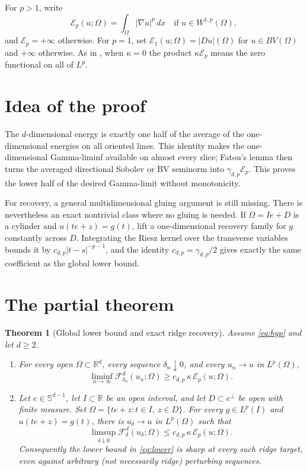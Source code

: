 \documentclass[11pt]{article}
\newtheorem{theorem}{Theorem}
\newcommand{\R}{\mathbb R}
\newcommand{\Sph}{\mathbb S}
\newcommand{\F}{\mathcal F}
\newcommand{\E}{\mathcal E}
\begin{document}
For $p>1$, write
\[
 \E_p(u;\Omega)=\int_\Omega|\nabla u|^p\,dx
 \quad\text{if }u\in W^{1,p}(\Omega),
\]
and $\E_p=+\infty$ otherwise.  For $p=1$, set
$\E_1(u;\Omega)=|Du|(\Omega)$ for $u\in BV(\Omega)$ and $+\infty$
otherwise.  As in \cite{BN1D}, when $\kappa=0$ the product
$\kappa\E_p$ means the zero functional on all of $L^p$.

\section{Idea of the proof}

The $d$-dimensional energy is exactly one half of the average of the
one-dimensional energies on all oriented lines.  This identity makes the
one-dimensional Gamma-liminf available on almost every slice; Fatou's lemma
then turns the averaged directional Sobolev or BV seminorm into
$\gamma_{d,p}\E_p$.  This proves the lower half of the desired Gamma-limit
without monotonicity.

For recovery, a general multidimensional gluing argument is still missing.
There is nevertheless an exact nontrivial class where no gluing is needed.
If $\Omega=I e+D$ is a cylinder and $u(te+z)=g(t)$, lift a one-dimensional
recovery family for $g$ constantly across $D$.  Integrating the Riesz kernel
over the transverse variables bounds it by
$c_{d,p}|t-s|^{-p-1}$, and the identity $c_{d,p}=\gamma_{d,p}/2$ gives exactly
the same coefficient as the global lower bound.

\section{The partial theorem}

\begin{theorem}[Global lower bound and exact ridge recovery]\label{thm:main}
Assume \eqref{eq:hyp} and let $d\geq2$.

\begin{enumerate}[label=\textup{(\roman*)}]
\item\label{it:lower}
For every open $\Omega\subset\R^d$, every sequence $\delta_n\downarrow0$,
and every $u_n\to u$ in $L^p(\Omega)$,
\begin{equation}\label{eq:lower}
 \liminf_{n\to\infty}\F^d_{\delta_n}(u_n;\Omega)
 \geq c_{d,p}\,\kappa\,\E_p(u;\Omega).
\end{equation}

\item\label{it:ridge}
Let $e\in\Sph^{d-1}$, let $I\subset\R$ be an open interval, and let
$D\subset e^\perp$ be open with finite measure.  Set
$\Omega=\{te+z:t\in I,\ z\in D\}$.  For every $g\in L^p(I)$ and
$u(te+z)=g(t)$, there is $u_\delta\to u$ in $L^p(\Omega)$ such that
\begin{equation}\label{eq:ridge}
 \limsup_{\delta\downarrow0}\F^d_\delta(u_\delta;\Omega)
 \leq c_{d,p}\,\kappa\,\E_p(u;\Omega).
\end{equation}
Consequently the lower bound in \eqref{eq:lower} is sharp at every such ridge
target, even against arbitrary (not necessarily ridge) perturbing sequences.
\end{enumerate}
\end{theorem}
\end{document}

